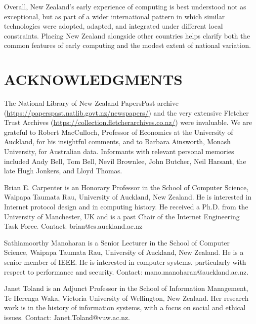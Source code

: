 \documentclass{IEEEcsmag}
\begin{document}
Overall, New Zealand's early experience of computing is best understood not as exceptional, but as part of a wider international pattern in which similar technologies were adopted, adapted, and integrated under different local constraints. Placing New Zealand alongside other countries helps clarify both the common features of early computing and the modest extent of national variation.
\vspace*{-8pt}
\section{ACKNOWLEDGMENTS}
The National Library of New Zealand PapersPast archive
(\href{https://paperspast.natlib.govt.nz/newspapers}{https://paperspast.natlib.govt.nz/newspapers/})
and the very extensive Fletcher Trust Archives
(\href{https://collection.fletcherarchives.co.nz/}{https://collection.fletcherarchives.co.nz/}) were invaluable.
We are grateful to Robert MacCulloch, Professor of Economics at the University of Auckland, for his
insightful comments, and to Barbara Ainsworth, Monash University, for Australian data.
Informants with relevant personal memories included Andy Bell, Tom Bell, Nevil Brownlee,
John Butcher, Neil Harsant, the late Hugh Jonkers, and Lloyd Thomas.





\begin{IEEEbiography}{Brian E. Carpenter} is an Honorary Professor in the School of Computer Science, Waipapa Taumata Rau, University of Auckland, New Zealand. He is interested in Internet protocol design and in computing history. He received a Ph.D. from the University of Manchester, UK and is a past Chair of the Internet Engineering Task Force. Contact: brian@cs.auckland.ac.nz\vspace*{8pt}
\end{IEEEbiography}

\begin{IEEEbiography}{Sathiamoorthy Manoharan} is a Senior Lecturer in the School of Computer Science, Waipapa Taumata Rau, University of Auckland, New Zealand.
He is a senior member of IEEE. He is interested in computer systems, particularly with respect to performance and security. Contact: mano.manoharan@auckland.ac.nz.\vspace*{8pt}
\end{IEEEbiography}

\begin{IEEEbiography}{Janet Toland} is an Adjunct Professor in the School of Information Management,
Te Herenga Waka, Victoria University of Wellington, New Zealand. Her research work is in the history of
information systems, with a focus on social and ethical issues. Contact: Janet.Toland@vuw.ac.nz.\vspace*{8pt}
\end{IEEEbiography}
\end{document}
